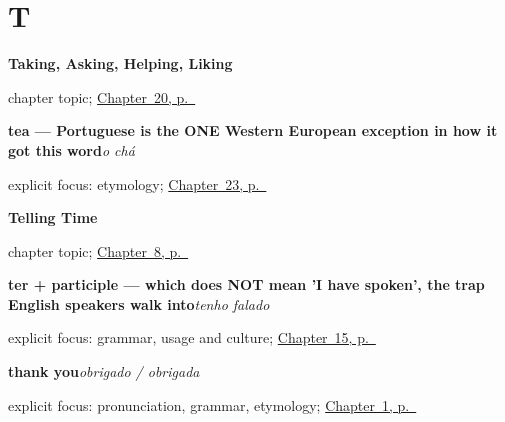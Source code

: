 \section*{T}

\noindent\begin{minipage}[t]{\linewidth}
\raggedright
\textbf{Taking, Asking, Helping, Liking}\par
\footnotesize chapter topic; \hyperref[ch:pt-taking-asking-helping-liking]{Chapter~20, p.~\pageref*{ch:pt-taking-asking-helping-liking}}
\end{minipage}\par\smallskip

\noindent\begin{minipage}[t]{\linewidth}
\raggedright
\textbf{tea — Portuguese is the ONE Western European exception in how it got this word}\enspace\emph{o chá}\par
\footnotesize explicit focus: etymology; \hyperref[ch:pt-coffee-tea-milk]{Chapter~23, p.~\pageref*{ch:pt-coffee-tea-milk}}
\end{minipage}\par\smallskip

\noindent\begin{minipage}[t]{\linewidth}
\raggedright
\textbf{Telling Time}\par
\footnotesize chapter topic; \hyperref[ch:pt-telling-time]{Chapter~8, p.~\pageref*{ch:pt-telling-time}}
\end{minipage}\par\smallskip

\noindent\begin{minipage}[t]{\linewidth}
\raggedright
\textbf{ter + participle — which does NOT mean 'I have spoken', the trap English speakers walk into}\enspace\emph{tenho falado}\par
\footnotesize explicit focus: grammar, usage and culture; \hyperref[ch:pt-past-portuguese-kept]{Chapter~15, p.~\pageref*{ch:pt-past-portuguese-kept}}
\end{minipage}\par\smallskip

\noindent\begin{minipage}[t]{\linewidth}
\raggedright
\textbf{thank you}\enspace\emph{obrigado / obrigada}\par
\footnotesize explicit focus: pronunciation, grammar, etymology; \hyperref[ch:greetings]{Chapter~1, p.~\pageref*{ch:greetings}}
\end{minipage}\par\smallskip

